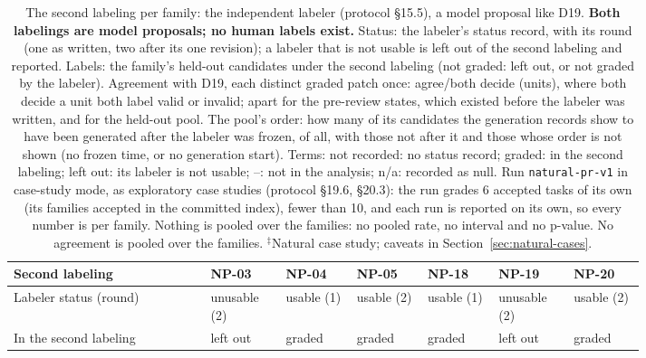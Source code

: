 \begin{table}[t]\centering\footnotesize
\caption{The second labeling per family: the independent labeler (protocol \S15.5), a model proposal like D19. \textbf{Both labelings are model proposals; no human labels exist.} Status: the labeler's status record, with its round (one as written, two after its one revision); a labeler that is not usable is left out of the second labeling and reported. Labels: the family's held-out candidates under the second labeling (not graded: left out, or not graded by the labeler). Agreement with D19, each distinct graded patch once: agree/both decide (units), where both decide a unit both label valid or invalid; apart for the pre-review states, which existed before the labeler was written, and for the held-out pool. The pool's order: how many of its candidates the generation records show to have been generated after the labeler was frozen, of all, with those not after it and those whose order is not shown (no frozen time, or no generation start). Terms: not recorded: no status record; graded: in the second labeling; left out: its labeler is not usable; --: not in the analysis; n/a: recorded as null. Run \texttt{natural-pr-v1} in case-study mode, as exploratory case studies (protocol \S19.6, \S20.3): the run grades 6 accepted tasks of its own (its families accepted in the committed index), fewer than 10, and each run is reported on its own, so every number is per family. Nothing is pooled over the families: no pooled rate, no interval and no p-value. No agreement is pooled over the families. $^{\ddagger}$Natural case study; caveats in Section~\ref{sec:natural-cases}.}\label{tab:nr-labeler}
\begin{tabular}{p{0.25\linewidth}p{0.093\linewidth}p{0.093\linewidth}p{0.093\linewidth}p{0.093\linewidth}p{0.093\linewidth}p{0.093\linewidth}}\toprule Second labeling & NP-03 & NP-04 & NP-05 & NP-18 & NP-19 & NP-20 \\\midrule
\raggedright\hspace{0pt}Labeler status (round) & \raggedright\hspace{0pt}unusable (2) & \raggedright\hspace{0pt}usable (1) & \raggedright\hspace{0pt}usable (2) & \raggedright\hspace{0pt}usable (1) & \raggedright\hspace{0pt}unusable (2) & \raggedright\hspace{0pt}usable (2) \tabularnewline
\raggedright\hspace{0pt}In the second labeling & \raggedright\hspace{0pt}left out & \raggedright\hspace{0pt}graded & \raggedright\hspace{0pt}graded & \raggedright\hspace{0pt}graded & \raggedright\hspace{0pt}left out & \raggedright\hspace{0pt}graded \tabularnewline\midrule

\end{tabular}
\end{table}
